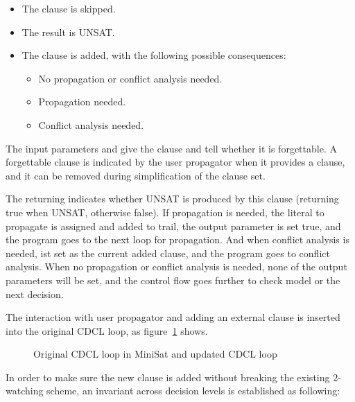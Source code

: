 \begin{itemize}
  \item The clause is skipped.
  \item The result is UNSAT.
  \item The clause is added, with the following possible consequences:
    \begin{itemize}
      \item No propagation or conflict analysis needed.
      \item Propagation needed.
      \item Conflict analysis needed.
    \end{itemize}
\end{itemize}

The input parameters  and  give the clause and tell whether it is forgettable. A forgettable clause is indicated by the user propagator when it provides a clause, and it can be removed during simplification of the clause set.

The returning  indicates whether UNSAT is produced by this clause (returning true when UNSAT, otherwise false). If propagation is needed, the literal to propagate is assigned and added to trail, the output parameter  is set true, and the program goes to the next loop for propagation. And when conflict analysis is needed,  ist set as the current added clause, and the program goes to conflict analysis. When no propagation or conflict analysis is needed, none of the output parameters will be set, and the control flow goes further to check model or the next decision.

The interaction with user propagator and adding an external clause is inserted into the original CDCL loop, as figure~\ref{fig:flow} shows.

\begin{figure}[h!]
  \centering
  
  \caption{Original CDCL loop in MiniSat and updated CDCL loop}
  \label{fig:flow}
\end{figure}

In order to make sure the new clause is added without breaking the existing 2-watching scheme, an invariant across decision levels is established as following:

